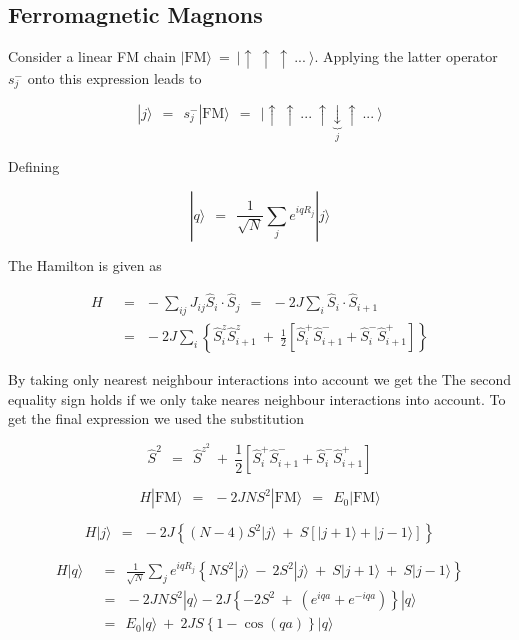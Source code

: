 \documentclass[10pt]{report}
\numberwithin{equation}{chapter}
\begin{document}
\subsection{Ferromagnetic Magnons}

Consider a linear FM chain $ | \text{FM} \rangle ~=~ | \uparrow~ \uparrow~ \uparrow~ ...~ \rangle$. Applying the latter operator $ s^-_j$ onto this expression leads to

\begin{equation}
  | j \rangle ~~=~~ s^-_j | \text{FM} \rangle ~~=~~ 
  | \uparrow~ \uparrow~ ...~ \uparrow \underbrace{\downarrow}_{j} \uparrow~ ...~ \rangle
\end{equation}


Defining

\begin{equation}
  | q \rangle ~~=~~ \frac{1}{\sqrt{N}} \sum_j e^{i q R_j} | j \rangle
\end{equation}

The Hamilton is given as 

\begin{align}
  H ~~& =~~ - \sum_{ij} J_{ij} \hat{S}_i \cdot \hat{S}_j ~~=~~ -2J \sum_i \hat{S}_i \cdot \hat{S}_{i+1}\nonumber \\
      & =~~ - 2J \sum_i \left\{ \hat{S}^z_i \hat{S}^z_{i+1} ~+~ 
      \frac{1}{2} \left[ \hat{S}^+_i \hat{S}^-_{i+1} + \hat{S}^-_i \hat{S}^+_{i+1} \right]  \right\}
\end{align}

By taking only nearest neighbour interactions into account we get the 
The second equality sign holds if we only take neares neighbour interactions into account. To get the final expression we used the substitution

\begin{equation}
  \hat{S}^2 ~~=~~ \hat{S}^{z^2} ~+~ \frac{1}{2} \left[ \hat{S}^+_i \hat{S}^-_{i+1} + \hat{S}^-_i \hat{S}^+_{i+1} \right]
\end{equation}


\begin{equation}
  H | \text{FM} \rangle ~~=~~ -2 J N S^2 | \text{FM} \rangle ~~=~~ E_0 | \text{FM} \rangle
\end{equation}

\begin{equation}
  H | j \rangle ~~=~~ -2J \left\{ (N-4) S^2 | j \rangle ~+~ S \left[ |j+1\rangle + |j-1\rangle \right] \right\}
\end{equation}

\begin{align}
  H | q \rangle ~~& =~~ \frac{1}{\sqrt{N}} \sum_j e^{i q R_j} \left\{
  NS^2 |j\rangle ~-~ 2S^2|j\rangle ~+~ S |j+1\rangle ~+~ S|j-1\rangle \right\} \nonumber \\
                  & =~~ -2JNS^2 |q\rangle - 2J \left\{ -2S^2 ~+~ \left( e^{iqa} + e^{-iqa} \right) \right\} |q\rangle \nonumber \\
                  & =~~ E_0 |q\rangle ~+~ 2JS \left\{ 1 - \cos(qa) \right\} |q\rangle 
\end{align}
\end{document}
